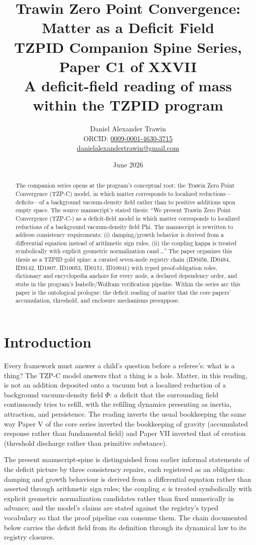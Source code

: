 \documentclass[11pt]{article}
\title{Trawin Zero Point Convergence: Matter as a Deficit Field\\[0.6em]
\large TZPID Companion Spine Series, Paper C1 of XXVII\\
\normalsize A deficit-field reading of mass within the TZPID program}
\author{Daniel Alexander Trawin\\
\small ORCID: \href{https://orcid.org/0009-0001-4630-3715}{0009-0001-4630-3715}\\
\small \href{mailto:danielalexandertrawin@gmail.com}{danielalexandertrawin@gmail.com}}
\date{June 2026}
\theoremstyle{remark}
\begin{document}
\maketitle

\begin{abstract}
The companion series opens at the program's conceptual root: the Trawin Zero Point Convergence (TZP-C) model, in which matter corresponds to localized reductions---deficits---of a background vacuum-density field rather than to positive additions upon empty space.
The source manuscript's stated thesis: ``We present Trawin Zero Point Convergence (TZP-C-) as a deficit-field model in which matter corresponds to localized reductions of a background vacuum-density field Phi. The manuscript is rewritten to address consistency requirements: (i) damping/growth behavior is derived from a differential equation instead of arithmetic sign rules, (ii) the coupling kappa is treated symbolically with explicit geometric normalization cand\,\ldots'' The paper organizes this thesis as a TZPID gold spine: a curated seven-node registry chain (ID0456, ID0484, ID9142, ID1807, ID10053, ID0151, ID10041) with typed proof-obligation roles, dictionary and encyclopedia anchors for every node, a declared dependency order, and stubs in the program's Isabelle/Wolfram verification pipeline. Within the series arc this paper is the ontological prologue: the deficit reading of matter that the core papers' accumulation, threshold, and enclosure mechanisms presuppose.
\end{abstract}

\section{Introduction}
\label{sec:intro}

Every framework must answer a child's question before a referee's: what is a thing? The TZP-C model answers that a thing is a hole. Matter, in this reading, is not an addition deposited onto a vacuum but a localized reduction of a background vacuum-density field $\Phi$: a deficit that the surrounding field continuously tries to refill, with the refilling dynamics presenting as inertia, attraction, and persistence. The reading inverts the usual bookkeeping the same way Paper V of the core series inverted the bookkeeping of gravity (accumulated response rather than fundamental field) and Paper VII inverted that of creation (threshold discharge rather than primitive substance).

The present manuscript-spine is distinguished from earlier informal statements of the deficit picture by three consistency repairs, each registered as an obligation: damping and growth behaviour is derived from a differential equation rather than asserted through arithmetic sign rules; the coupling $\kappa$ is treated symbolically with explicit geometric normalization candidates rather than fixed numerically in advance; and the model's claims are stated against the registry's typed vocabulary so that the proof pipeline can consume them. The chain documented below carries the deficit field from its definition through its dynamical law to its registry closures.
\end{document}
